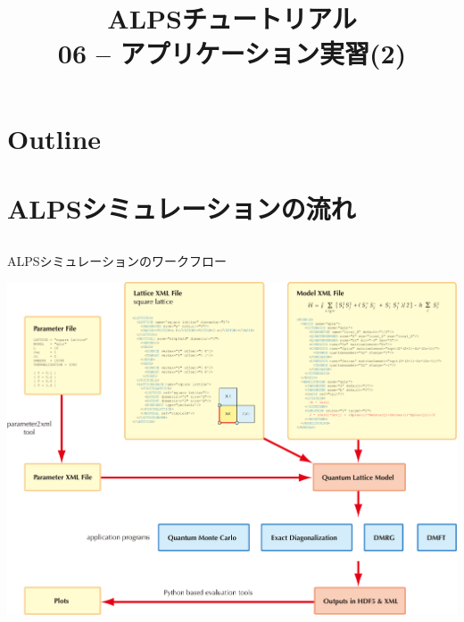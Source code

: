 
\title{ALPSチュートリアル \\ 06 -- アプリケーション実習(2)}




\begin{frame}
  \titlepage
\end{frame}

\section*{Outline}
\begin{frame}[t,fragile]
   \tableofcontents
\end{frame}

\section{ALPSシミュレーションの流れ}

\subsection*{\redm\whiteb\greenb}
\begin{frame}{ALPSシミュレーションのワークフロー}
  \begin{center}
    \includegraphics[height=0.8\textheight]{workflow.pdf}
  \end{center}
\end{frame}

